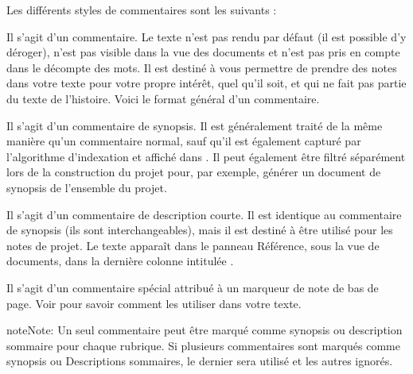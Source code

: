 \documentclass[a4paper,11pt,french]{sphinxmanual}
\begin{document}
\sphinxAtStartPar
Les différents styles de commentaires sont les suivants :
\begin{description}
\sphinxAtStartPar
Il s’agit d’un commentaire. Le texte n’est pas rendu par défaut (il est possible d’y déroger), n’est pas visible dans la vue des documents et n’est pas pris en compte dans le décompte des mots. Il est destiné à vous permettre de prendre des notes dans votre texte pour votre propre intérêt, quel qu’il soit, et qui ne fait pas partie du texte de l’histoire. Voici le format général d’un commentaire.

\sphinxAtStartPar
Il s’agit d’un commentaire de synopsis. Il est généralement traité de la même manière qu’un commentaire normal, sauf qu’il est également capturé par l’algorithme d’indexation et affiché dans {\hyperref[\detokenize{usage_project:a-ui-outline}]{}}. Il peut également être filtré séparément lors de la construction du projet pour, par exemple, générer un document de synopsis de l’ensemble du projet.

\sphinxAtStartPar
Il s’agit d’un commentaire de description courte. Il est identique au commentaire de synopsis (ils sont interchangeables), mais il est destiné à être utilisé pour les notes de projet. Le texte apparaît dans le panneau Référence, sous la vue de documents, dans la dernière colonne intitulée .

\sphinxAtStartPar
Il s’agit d’un commentaire spécial attribué à un marqueur de note de bas de page. Voir {\hyperref[\detokenize{usage_format:a-fmt-footnote}]{}} pour savoir comment les utiliser dans votre texte.

\end{description}

\begin{sphinxadmonition}{note}{Note:}
\sphinxAtStartPar
Un seul commentaire peut être marqué comme synopsis ou description sommaire pour chaque rubrique. Si plusieurs commentaires sont marqués comme synopsis ou Descriptions sommaires, le dernier sera utilisé et les autres ignorés.
\end{sphinxadmonition}
\end{document}
